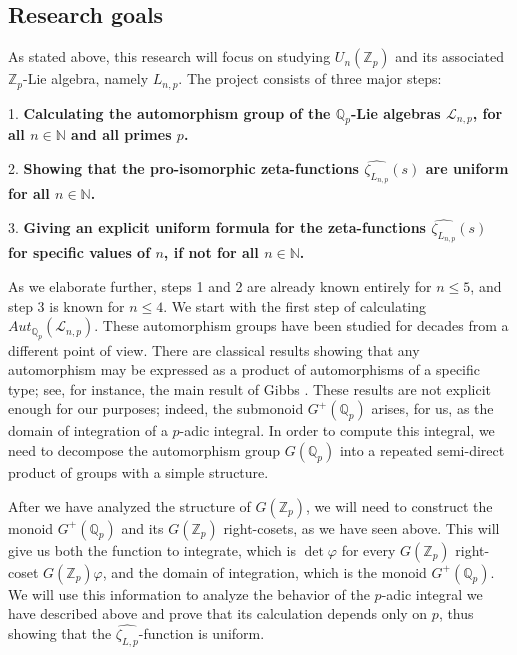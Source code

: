 \documentclass[12pt]{article}
\begin{document}
\subsection{Research goals}
As stated above, this research will focus on studying $U_n(\mathbb{Z}_p)$ and its associated $\mathbb{Z}_p$-Lie algebra, namely $L_{n,p}$. The project consists of three major steps:\par
1. \textbf{Calculating the automorphism group of the $\mathbb{Q}_p$-Lie algebras $\mathcal{L}_{n,p}$, for all $n\in\mathbb{N}$ and all primes $p$.}\par
2. \textbf{Showing that the pro-isomorphic zeta-functions $\hat{\zeta_{L_{n,p}}}(s)$ are uniform for all $n\in\mathbb{N}$.}\par
3. \textbf{Giving an explicit uniform formula for the zeta-functions $\hat{\zeta_{L_{n,p}}}(s)$ for specific values of $n$, if not for all $n\in\mathbb{N}$.}\par
As we elaborate further, steps 1 and 2 are already known entirely for $n\leq 5$, and step 3 is known for $n\leq 4$.
We start with the first step of calculating $Aut_{\mathbb{Q}_p}(\mathcal{L}_{n,p})$. These automorphism groups have been studied for decades from a different point of view.  There are classical results showing that any automorphism may be expressed as a product of automorphisms of a specific type; see, for instance, the main result of Gibbs \cite{Gibbs}.  These results are not explicit enough for our purposes; indeed, the submonoid $G^+(\mathbb{Q}_p)$ arises, for us, as the domain of integration of a $p$-adic integral.  In order to compute this integral, we need to decompose the automorphism group $G(\mathbb{Q}_p)$ into a repeated semi-direct product of groups with a simple structure.
\par
After we have analyzed the structure of $G(\mathbb{Z}_p)$, we will need to construct the monoid $G^{+}(\mathbb{Q}_p)$ and its $G(\mathbb{Z}_p)$ right-cosets, as we have seen above. This will give us both the function to integrate, which is $\det\varphi$ for every $G(\mathbb{Z}_p)$ right-coset $G(\mathbb{Z}_p)\varphi$, and the domain of integration, which is the monoid $G^+(\mathbb{Q}_p)$. We will use this information to analyze the behavior of the $p$-adic integral we have described above and prove that its calculation depends only on $p$, thus showing that the $\hat{\zeta_{L,p}}$-function is uniform.
\end{document}
